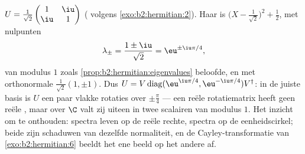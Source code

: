\begin{example}\label{ex:b2:hermitian:unitary}
$U = \frac{1}{\sqrt2}\begin{pmatrix} 1 & \iu\\ \iu & 1
\end{pmatrix}$ ( volgens \cref{exo:b2:hermitian:2}). Haar
 is $\bigl(X - \frac{1}{\sqrt2}\bigr)^2 +
\frac12$, met nulpunten
\[
\lambda_\pm = \frac{1 \pm \iu}{\sqrt2} = \eu^{\pm\iu\pi/4},
\]
van modulus $1$ zoals \cref{prop:b2:hermitian:eigenvalues}
beloofde, en met orthonormale  $\frac{1}{\sqrt2}(1,
\pm1)$. Dus $U = V\operatorname{diag}(\eu^{\iu\pi/4},
\eu^{-\iu\pi/4})V^\dagger$: in de juiste basis is $U$ een paar
vlakke rotaties over $\pm\frac\pi4$ --- een reële rotatiematrix
heeft geen reële , maar over $\C$ valt zij uiteen in
twee scalairen van modulus $1$. Het inzicht om te onthouden:
 spectra leven op de reële rechte,  spectra op
de eenheidscirkel; beide zijn schaduwen van dezelfde normaliteit,
en de Cayley-transformatie van \cref{exo:b2:hermitian:6} beeldt het
ene beeld op het andere af.
\end{example}

